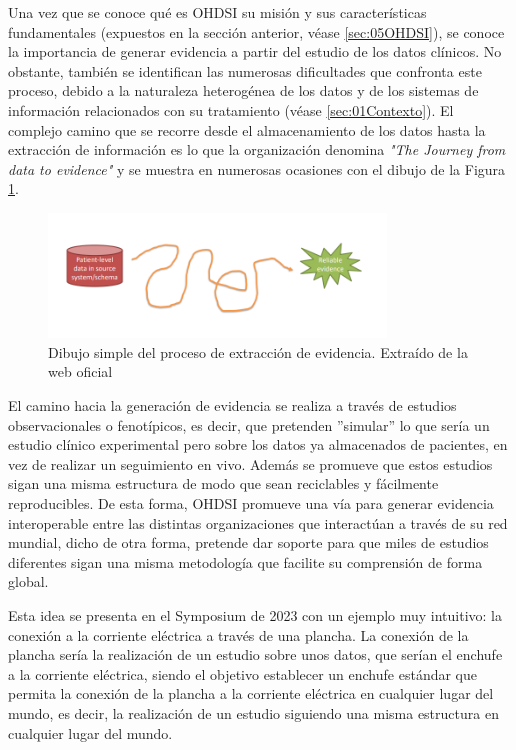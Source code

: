 Una vez que se conoce qué es OHDSI su misión y sus características fundamentales (expuestos en la sección anterior, véase \ref{sec:05OHDSI}), se conoce la importancia de generar evidencia a partir del estudio de los datos clínicos. No obstante, también se identifican las numerosas dificultades que confronta este proceso, debido a la naturaleza heterogénea de los datos y de los sistemas de información relacionados con su tratamiento (véase \ref{sec:01Contexto}). El complejo camino que se recorre desde el almacenamiento de los datos hasta la extracción de información es lo que la organización denomina \textit{"The Journey from data to evidence"} y se muestra en numerosas ocasiones con el dibujo de la Figura \ref{fig:drawinJourney}.

\begin{figure}[H]
    \centering
    \includegraphics[width=0.80\textwidth]{figures/drawinJourney.png}
     \caption{Dibujo simple del proceso de extracción de evidencia. Extraído de la web oficial \cite{OHDSIwebsite}}
    \label{fig:drawinJourney}
\end{figure}

El camino hacia la generación de evidencia se realiza a través de estudios observacionales o fenotípicos, es decir, que pretenden ''simular'' lo que sería un estudio clínico experimental pero sobre los datos ya almacenados de pacientes, en vez de realizar un seguimiento en vivo. Además se promueve que estos estudios sigan una misma estructura de modo que sean reciclables y fácilmente reproducibles. De esta forma, OHDSI promueve una vía para generar evidencia interoperable entre las distintas organizaciones que interactúan a través de su red mundial, dicho de otra forma, pretende dar soporte para que miles de estudios diferentes sigan una misma metodología que facilite su comprensión de forma global.

Esta idea se presenta en el Symposium de 2023 con un ejemplo muy intuitivo: la conexión a la corriente eléctrica a través de una plancha. La conexión de la plancha sería la realización de un estudio sobre unos datos, que serían el enchufe a la corriente eléctrica, siendo el objetivo establecer un enchufe estándar que permita la conexión de la plancha a la corriente eléctrica en cualquier lugar del mundo, es decir, la realización de un estudio siguiendo una misma estructura en cualquier lugar del mundo.

